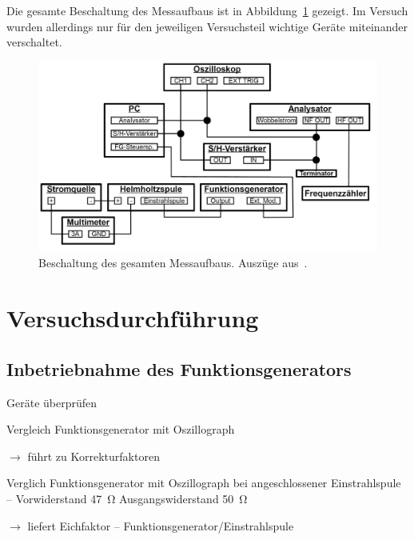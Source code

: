 \documentclass[paper=a4,
	fontsize=10pt,
	DIV=18,
	twocolumn,
	parskip=half
	]{scrartcl}
\numberwithin{equation}{section}    %
\newcommand{\tra}{$\rightarrow$}
\begin{document}
Die gesamte Beschaltung des Messaufbaus ist in Abbildung~\ref{fig.beschaltung} gezeigt. Im Versuch wurden allerdings nur für den jeweiligen Versuchsteil wichtige Geräte miteinander verschaltet.

\begin{figure}[htp]
	\includegraphics[width=\columnwidth]{Bilder/messbeschaltung.pdf}
	\caption{Beschaltung des gesamten Messaufbaus. Auszüge aus~\citet{anleitung}.}
	\label{fig.beschaltung}
\end{figure}


\section{Versuchsdurchführung}
\label{durchfuehrung}
%
\subsection{Inbetriebnahme des Funktionsgenerators}
\label{vorbereitung1}

\begin{compactitem}
	\item Geräte überprüfen
	\item Vergleich Funktionsgenerator mit Oszillograph
	\item[\tra] führt zu Korrekturfaktoren
	\item Verglich Funktionsgenerator mit Oszillograph bei angeschlossener Einstrahlspule \--- Vorwiderstand \SI{47}{\ohm} Ausgangswiderstand \SI{50}{\ohm}
	\item[\tra] liefert Eichfaktor \--- Funktionsgenerator/Einstrahlspule
\end{compactitem}
\end{document}

